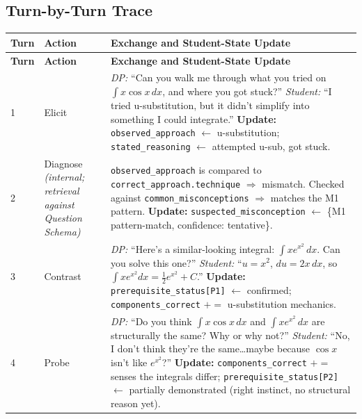 \documentclass[11pt]{article}
\begin{document}
\subsection{Turn-by-Turn Trace}

\small
\begin{longtable}{P{1.0cm} P{2.1cm} P{12.4cm}}
\toprule
\textbf{Turn} & \textbf{Action} & \textbf{Exchange and Student-State Update} \\
\midrule
\endfirsthead
\toprule
\textbf{Turn} & \textbf{Action} & \textbf{Exchange and Student-State Update} \\
\midrule
\endhead

1 & Elicit &
  \textit{DP:} ``Can you walk me through what you tried on
  $\int x\cos x\,dx$, and where you got stuck?'' \newline
  \textit{Student:} ``I tried u-substitution, but it didn't simplify into
  something I could integrate.'' \newline
  \textbf{Update:} \texttt{observed\_approach} $\leftarrow$
  u-substitution; \texttt{stated\_reasoning} $\leftarrow$ attempted
  u-sub, got stuck. \\[2mm]

2 & Diagnose \newline \textit{(internal; retrieval against Question Schema)} &
  \texttt{observed\_approach} is compared to
  \texttt{correct\_approach.technique} $\Rightarrow$ mismatch. Checked
  against \texttt{common\_misconceptions} $\Rightarrow$ matches the M1
  pattern. \newline
  \textbf{Update:} \texttt{suspected\_misconception} $\leftarrow$
  \{M1 pattern-match, confidence: tentative\}. \\[2mm]

3 & Contrast &
  \textit{DP:} ``Here's a similar-looking integral:
  $\int x e^{x^2}\,dx$. Can you solve this one?'' \newline
  \textit{Student:} ``$u=x^2$, $du=2x\,dx$, so
  $\int x e^{x^2}dx = \tfrac12 e^{x^2}+C$.'' \newline
  \textbf{Update:} \texttt{prerequisite\_status[P1]} $\leftarrow$
  confirmed; \texttt{components\_correct} $\mathrel{+}=$
  u-substitution mechanics. \\[2mm]

4 & Probe &
  \textit{DP:} ``Do you think $\int x\cos x\,dx$ and
  $\int x e^{x^2}\,dx$ are structurally the same? Why or why not?''
  \newline
  \textit{Student:} ``No, I don't think they're the same\ldots maybe
  because $\cos x$ isn't like $e^{x^2}$?'' \newline
  \textbf{Update:} \texttt{components\_correct} $\mathrel{+}=$ senses
  the integrals differ; \texttt{prerequisite\_status[P2]} $\leftarrow$
  partially demonstrated (right instinct, no structural reason yet). \\[2mm]


\end{longtable}
\end{document}
